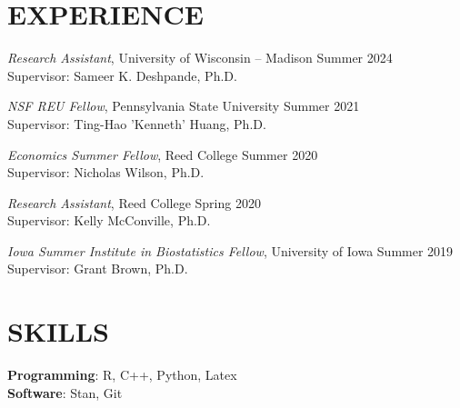 \documentclass[margin]{res}
\begin{document}
\begin{resume}

\section{EXPERIENCE}

\emph{Research Assistant}, University of Wisconsin -- Madison \hfill Summer 2024 \\
Supervisor: Sameer K. Deshpande, Ph.D.

\emph{NSF REU Fellow}, Pennsylvania State University \hfill Summer 2021 \\
Supervisor: Ting-Hao 'Kenneth' Huang, Ph.D.

\emph{Economics Summer Fellow}, Reed College \hfill Summer 2020 \\
Supervisor: Nicholas Wilson, Ph.D.

\emph{Research Assistant}, Reed College \hfill Spring 2020 \\
Supervisor: Kelly McConville, Ph.D.

\emph{Iowa Summer Institute in Biostatistics Fellow}, University of Iowa \hfill Summer 2019 \\
Supervisor: Grant Brown, Ph.D.


\section{SKILLS}

\textbf{Programming}: R, C++, Python, Latex \\
\textbf{Software}: Stan, Git

\end{resume} 
\end{document}
